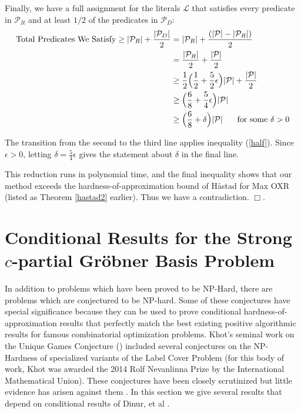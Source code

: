 \documentclass{article}
\begin{document}
Finally, we have a full assignment for the literals $\mathcal{L}$ that satisfies every predicate in $\mathcal{P}_R$ and at least $1/2$ of the predicates in $\mathcal{P}_D$:
\begin{align*}
\text{Total Predicates We Satisfy}\geq|\mathcal{P}_R|+\frac{|\mathcal{P}_D|}{2} &= 
|\mathcal{P}_R|+\frac{(|\mathcal{P}|-|\mathcal{P}_R|)}{2}\\
&= 
\frac{|\mathcal{P}_R|}{2}+\frac{|\mathcal{P}|}{2}\\
&\geq 
\frac{1}{2}\Big(\frac{1}{2}+\frac{5}{2}\epsilon\Big)|\mathcal{P}|+\frac{|\mathcal{P}|}{2}\\
&\geq 
\Big(\frac{6}{8}+\frac{5}{4}\epsilon\Big)|\mathcal{P}|\\
&\geq 
\Big(\frac{6}{8}+\delta\Big)|\mathcal{P}| \hspace{5mm} \text{ for some  $\delta>0$}
\end{align*}

The transition from the second to the third line applies inequality (\ref{half}). Since $\epsilon>0$, letting $\delta=\frac{5}{4}\epsilon$ gives the statement about $\delta$ in the final line. 

This reduction runs in polynomial time, and the
final inequality shows that our method exceeds the hardness-of-approximation bound of H{\aa}stad for Max OXR (listed as Theorem \ref{hastad2} earlier). Thus we have a contradiction. $\Box$.









\section{Conditional Results for the Strong $c$-partial Gr\"{o}bner Basis Problem}

In addition to problems which have been proved to be NP-Hard, there are problems which are conjectured to be NP-hard. Some of these conjectures have special significance because they can be used to prove conditional hardness-of-approximation results that perfectly match the best existing positive algorithmic results for famous combinatorial optimization problems. Khot's seminal work on the Unique Games Conjecture (\cite{Khot02}) included several conjectures on the NP-Hardness of specialized variants of the Label Cover Problem (for this body of work, Khot was awarded the 2014 Rolf Nevanlinna Prize by the International Mathematical Union). These conjectures have been closely scrutinized but little evidence has arisen against them \cite{dinur}. In this section we give several results that depend on conditional results of Dinur, et al \cite{dinur}.
\end{document}
